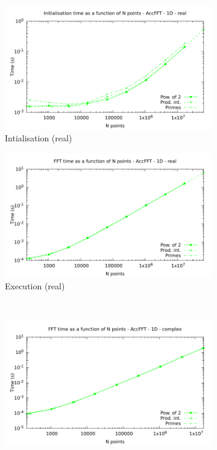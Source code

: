 \documentclass[12pt, a4paper]{article}
\begin{document}
\begin{figure}[H]
\captionsetup{width=0.8\linewidth}
\centering
\begin{subfigure}{.5\textwidth}
\centering
\includegraphics[width=.9\linewidth]{graphs/fft-openacc-1d-pow2-r-init.pdf}
\caption{Intialisation (real)}
\label{FFTACC1DRI}
\end{subfigure}%
\begin{subfigure}{.5\textwidth}
\centering
\includegraphics[width=.9\linewidth]{graphs/fft-openacc-1d-pow2-r-exec.pdf}
\caption{Execution (real)}
\label{FFTACC1DRE}
\end{subfigure}\\
\begin{subfigure}{.5\textwidth}
\centering
\includegraphics[width=.9\linewidth]{graphs/fft-openacc-1d-pow2-c-exec.pdf}

\end{subfigure}
\end{figure}
\end{document}
